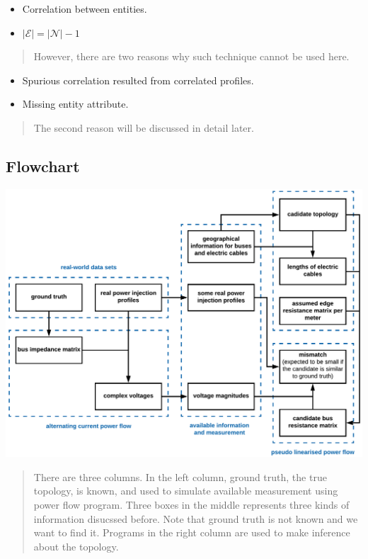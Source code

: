 \documentclass[
]{book}
\providecommand{\tightlist}{%
  \setlength{\itemsep}{0pt}\setlength{\parskip}{0pt}}
\begin{document}
\begin{itemize}
\tightlist
\item
  Correlation between entities.
\item
  \(|\mathcal{E}| = |\mathcal{N}| - 1\)
\end{itemize}

\begin{quote}
However, there are two reasons why such technique cannot be used here.
\end{quote}

\begin{itemize}
\tightlist
\item
  Spurious correlation resulted from correlated profiles.
\item
  Missing entity attribute.
\end{itemize}

\begin{quote}
The second reason will be discussed in detail later.
\end{quote}

\hypertarget{flowchart}{%
\subsection*{Flowchart}\label{flowchart}}

\includegraphics{Pictures/figFlowchart3.png}

\begin{quote}
There are three columns. In the left column, ground truth, the true topology,
is known, and used to simulate available measurement using power flow
program. Three boxes in the middle represents three kinds of information
disucssed before. Note that ground truth is not known and we want to find it.
Programs in the right column are used to make inference about the topology.
\end{quote}
\end{document}
